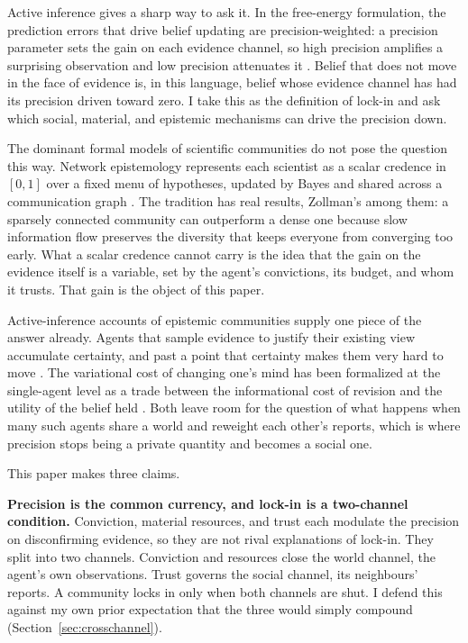 \documentclass[11pt]{article}
\begin{document}
Active inference gives a sharp way to ask it. In the free-energy formulation,
the prediction errors that drive belief updating are precision-weighted: a
precision parameter sets the gain on each evidence channel, so high precision
amplifies a surprising observation and low precision attenuates it
\citep{feldmanFriston2010Attention,parrFriston2019Attention}. Belief that does
not move in the face of evidence is, in this language, belief whose evidence
channel has had its precision driven toward zero. I take this as the definition
of lock-in and ask which social, material, and epistemic mechanisms can drive
the precision down.

The dominant formal models of scientific communities do not pose the question
this way. Network epistemology represents each scientist as a scalar credence
in $[0,1]$ over a fixed menu of hypotheses, updated by Bayes and shared across
a communication graph \citep{zollman2010TransientDiversity,
oconnorWeatherall2019Misinformation}. The tradition has real results, Zollman's
among them: a sparsely connected community can outperform a dense one because
slow information flow preserves the diversity that keeps everyone from
converging too early. What a scalar credence cannot carry is the idea that the
gain on the evidence itself is a variable, set by the agent's convictions, its
budget, and whom it trusts. That gain is the object of this paper.

Active-inference accounts of epistemic communities supply one piece of the
answer already. Agents that sample evidence to justify their existing view
accumulate certainty, and past a point that certainty makes them very hard to
move \citep{albarracin2022EpistemicCommunities}. The variational cost of
changing one's mind has been formalized at the single-agent level as a trade
between the informational cost of revision and the utility of the belief held
\citep{hylandAlbarracin2025MindChange}. Both leave room for the question of
what happens when many such agents share a world and reweight each other's
reports, which is where precision stops being a private quantity and becomes a
social one.

This paper makes three claims.

\textbf{Precision is the common currency, and lock-in is a two-channel
condition.} Conviction, material resources, and trust each modulate the
precision on disconfirming evidence, so they are not rival explanations of
lock-in. They split into two channels. Conviction and resources close the world
channel, the agent's own observations. Trust governs the social channel, its
neighbours' reports. A community locks in only when both channels are shut. I
defend this against my own prior expectation that the three would simply
compound (Section~\ref{sec:crosschannel}).
\end{document}
